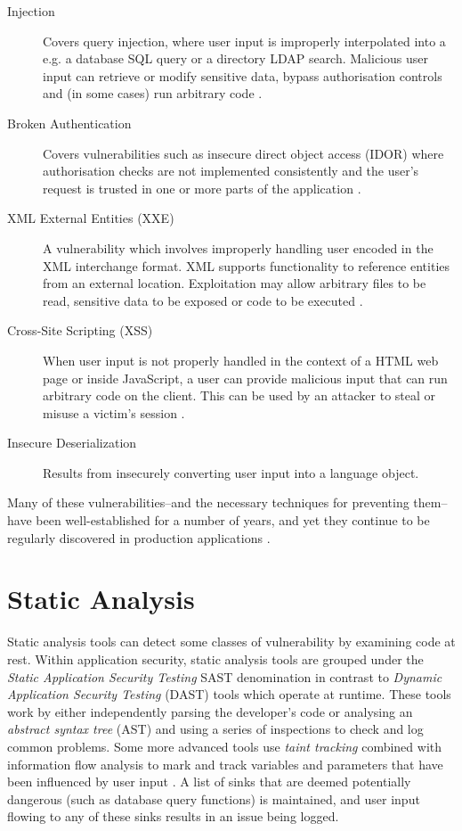 \documentclass[a4paper,openany]{book}
\begin{document}
\begin{description}
	\item[Injection] Covers query injection, where user input is improperly interpolated into a e.g. a database SQL query or a directory LDAP search. Malicious user input can retrieve or modify sensitive data, bypass authorisation controls and (in some cases) run arbitrary code \citep[p.~291]{stuttard2011web}.
	\item[Broken Authentication] Covers vulnerabilities such as insecure direct object access (IDOR) where authorisation checks are not implemented consistently and the user's request is trusted in one or more parts of the application \citep[p.~257]{stuttard2011web}.
	\item[XML External Entities (XXE)] A vulnerability which involves improperly handling user encoded in the XML interchange format. XML supports functionality to reference entities from an external location. Exploitation may allow arbitrary files to be read, sensitive data to be exposed or code to be executed  \citep[p.~384]{stuttard2011web}.
	\item[Cross-Site Scripting (XSS)] When user input is not properly handled in the context of a HTML web page or inside JavaScript, a user can provide malicious input that can run arbitrary code on the client. This can be used by an attacker to steal or misuse a victim's session \citep[p.~431]{stuttard2011web}.
	\item[Insecure Deserialization] Results from insecurely converting user input into a language object.
\end{description}

Many of these vulnerabilities--and the necessary techniques for preventing them--have been well-established for a number of years, and yet they continue to be regularly discovered in production applications \citep[p.~2]{schneier2011secrets}.

\section{Static Analysis}

Static analysis tools can detect some classes of vulnerability by examining code at rest. Within application security, static analysis tools are grouped under the \emph{Static Application Security Testing} SAST denomination in contrast to \emph{Dynamic Application Security Testing} (DAST) tools which operate at runtime. These tools work by either independently parsing the developer's code or analysing an \emph{abstract syntax tree} (AST) and using a series of inspections to check and log common problems. Some more advanced tools use \emph{taint tracking} combined with information flow analysis to mark and track variables and parameters that have been influenced by user input \citep{denning1977certification}. A list of sinks that are deemed potentially dangerous (such as database query functions) is maintained, and user input flowing to any of these sinks results in an issue being logged.
\end{document}
